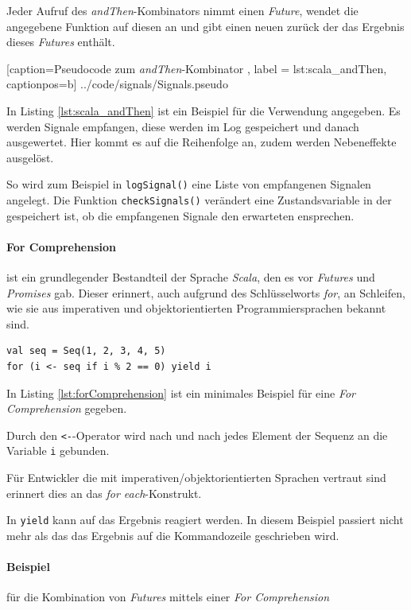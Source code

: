 Jeder Aufruf des \emph{andThen}-Kombinators nimmt einen \emph{Future},
wendet die angegebene Funktion auf diesen an und gibt einen neuen
zurück der das Ergebnis dieses \emph{Futures} enthält.


    [caption={Pseudocode zum \emph{andThen}-Kombinator },
       label = lst:scala_andThen,
       captionpos=b]
 {../code/signals/Signals.pseudo}
 
In Listing \ref{lst:scala_andThen} ist ein Beispiel
für die Verwendung angegeben. Es werden Signale empfangen, diese
werden im Log gespeichert und danach ausgewertet. Hier kommt es auf
die Reihenfolge an, zudem werden Nebeneffekte ausgelöst.

So wird zum Beispiel in \texttt{logSignal()} eine Liste von empfangenen
Signalen angelegt. Die Funktion \texttt{checkSignals()} verändert
eine Zustandsvariable in der gespeichert ist, ob die empfangenen
Signale den erwarteten ensprechen.

\paragraph{For Comprehension} ist ein grundlegender Bestandteil
der Sprache \emph{Scala}, den es vor \emph{Futures} und \emph{Promises}
gab. Dieser erinnert, auch aufgrund des Schlüsselworts \emph{for},
an Schleifen, wie sie aus imperativen und objektorientierten
Programmiersprachen bekannt sind.

\begin{lstlisting}[caption={For Comprehension},label={lst:forComprehension},captionpos=b]
val seq = Seq(1, 2, 3, 4, 5)
for (i <- seq if i % 2 == 0) yield i
\end{lstlisting}

In Listing \ref{lst:forComprehension} ist ein minimales Beispiel für
eine \emph{For Comprehension} gegeben.

Durch den \texttt{<-}-Operator wird nach und nach jedes Element
der Sequenz an die Variable \texttt{i} gebunden.

Für Entwickler die mit imperativen/objektorientierten Sprachen
vertraut sind erinnert dies an das \emph{for each}-Konstrukt.

In \texttt{yield} kann auf das Ergebnis reagiert werden. In diesem
Beispiel passiert nicht mehr als das das Ergebnis auf die Kommandozeile
geschrieben wird.

\paragraph{Beispiel} für die Kombination von \emph{Futures} mittels
einer \emph{For Comprehension}

